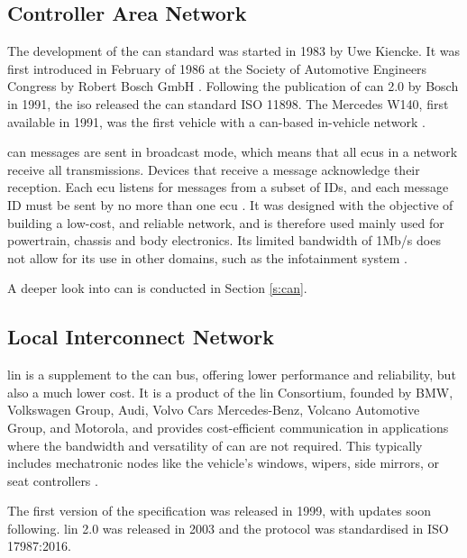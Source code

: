 \subsection{Controller Area Network}
\label{subsec:can}

The development of the \gls{can} standard was started in 1983 by Uwe Kiencke. It was first introduced in February of 1986 at the Society of Automotive Engineers Congress by Robert Bosch GmbH \citep{can}. Following the publication of \gls{can} 2.0 by Bosch in 1991, the \gls{iso} released the \gls{can} standard ISO 11898. The Mercedes W140, first available in 1991, was the first vehicle with a \gls{can}-based in-vehicle network \citep{CAN_Merc}.\par

\gls{can} messages are sent in broadcast mode, which means that all \glspl{ecu} in a network receive all transmissions. Devices that receive a message acknowledge their reception. Each \gls{ecu} listens for messages from a subset of IDs, and each message ID must be sent by no more than one \gls{ecu} \citep{kulandaivel2019canvas}. It was designed with the objective of building a low-cost, and reliable network, and is therefore used mainly used for powertrain, chassis and body electronics. Its limited bandwidth of 1Mb/s does not allow for its use in other domains, such as the infotainment system \citep{Huang2019}.\par

A deeper look into \gls{can} is conducted in Section \ref{s:can}.

\subsection{Local Interconnect Network}

\gls{lin} is a supplement to the \gls{can} bus, offering lower performance and reliability, but also a much lower cost. It is a product of the \gls{lin} Consortium, founded by BMW, Volkswagen Group, Audi, Volvo Cars Mercedes-Benz, Volcano Automotive Group, and Motorola, and provides cost-efficient communication in applications where the bandwidth and versatility of \gls{can} are not required. This typically includes mechatronic nodes like the vehicle’s windows, wipers, side mirrors, or seat controllers \citep{LIN}.\par

The first version of the specification was released in 1999, with updates soon following. \gls{lin} 2.0 was released in 2003 and the protocol was standardised in ISO 17987:2016.\par

